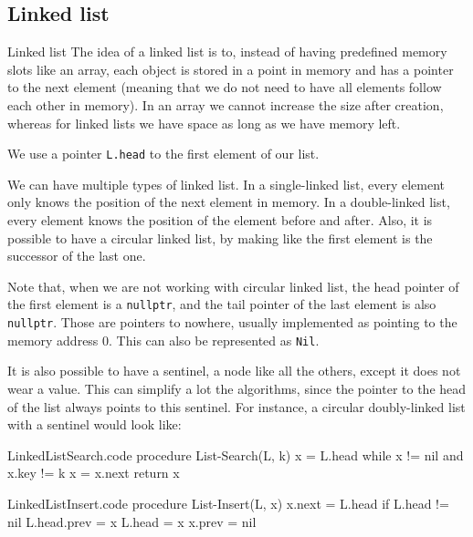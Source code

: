 \documentclass[a4paper]{article}
\begin{document}
\subsection{Linked list}
\begin{parag}{Linked list}
    The idea of a linked list is to, instead of having predefined memory slots like an array, each object is stored in a point in memory and has a pointer to the next element (meaning that we do not need to have all elements follow each other in memory). In an array we cannot increase the size after creation, whereas for linked lists we have space as long as we have memory left.

    We use a pointer \texttt{L.head} to the first element of our list.


    We can have multiple types of linked list. In a single-linked list, every element only knows the position of the next element in memory. In a double-linked list, every element knows the position of the element before and after. Also, it is possible to have a circular linked list, by making like the first element is the successor of the last one.

    Note that, when we are not working with circular linked list, the head pointer of the first element is a \texttt{nullptr}, and the tail pointer of the last element is also \texttt{nullptr}. Those are pointers to nowhere, usually implemented as pointing to the memory address 0. This can also be represented as \texttt{Nil}.

    It is also possible to have a sentinel, a node like all the others, except it does not wear a value. This can simplify a lot the algorithms, since the pointer to the head of the list always points to this sentinel. For instance, a circular doubly-linked list with a sentinel would look like:

\end{parag}

\begin{filecontents*}[overwrite]{LinkedListSearch.code}
procedure List-Search(L, k)
    x = L.head
    while x != nil and x.key != k
        x = x.next
    return x
\end{filecontents*}

\begin{filecontents*}[overwrite]{LinkedListInsert.code}
procedure List-Insert(L, x)
    x.next = L.head
    if L.head != nil
        L.head.prev = x
    L.head = x
    x.prev = nil
\end{filecontents*}
\end{document}

